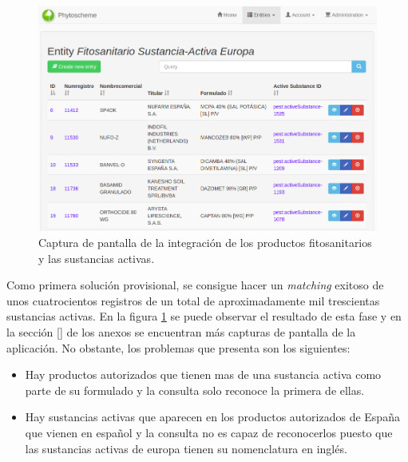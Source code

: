 \begin{figure}[!h]
    \centering
    \includegraphics[width=\textwidth,height=\textheight,keepaspectratio]{Imagenes/capturaFitSustAct}
    \caption{Captura de pantalla de la integración de  los productos fitosanitarios y las sustancias activas.}
    \label{fig:capturaFitSustAct}
\end{figure}

\par Como primera solución provisional, se consigue hacer un \textit{matching} exitoso de unos cuatrocientos registros de un total de aproximadamente mil trescientas sustancias activas. En la figura \ref{fig:capturaFitSustAct} se puede observar el resultado de esta fase y en la sección \ref{} de los anexos se encuentran más capturas de pantalla de la aplicación. No obstante, los problemas que presenta son los siguientes: 


\begin{itemize}
\item Hay productos autorizados que tienen mas de una sustancia activa como parte de su formulado y la consulta solo reconoce la primera de ellas.
\item Hay sustancias activas que aparecen en los productos autorizados de España que vienen en español y la consulta no es capaz de reconocerlos puesto que las sustancias activas de europa tienen su nomenclatura en inglés.
\end{itemize}


\bigskip


